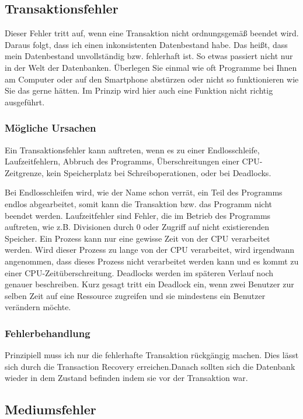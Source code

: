 \begin{flushleft}
\subsection{Transaktionsfehler}
Dieser Fehler tritt auf, wenn eine Transaktion nicht ordnungsgemäß beendet wird. Daraus folgt, dass ich einen inkonsistenten Datenbestand habe. Das heißt, dass mein Datenbestand unvollständig bzw. fehlerhaft ist. So etwas passiert nicht nur in der Welt der Datenbanken. Überlegen Sie einmal wie oft Programme bei Ihnen am Computer oder auf den Smartphone abstürzen oder nicht so funktionieren wie Sie das gerne hätten. Im Prinzip wird hier auch eine Funktion nicht richtig ausgeführt.

\subsubsection{Mögliche Ursachen}

Ein Transaktionsfehler kann auftreten, wenn es zu einer Endlosschleife, Laufzeitfehlern, Abbruch des Programms, Überschreitungen einer CPU-Zeitgrenze, kein Speicherplatz bei Schreiboperationen, oder bei Deadlocks.

Bei Endlosschleifen wird, wie der Name schon verrät, ein Teil des Programms endlos abgearbeitet, somit kann die Transaktion bzw. das Programm nicht beendet werden. 
Laufzeitfehler sind Fehler, die im Betrieb des Programms auftreten, wie z.B. Divisionen durch 0 oder Zugriff auf nicht existierenden Speicher. 
Ein Prozess kann nur eine gewisse Zeit von der CPU verarbeitet werden. Wird dieser Prozess zu lange von der CPU verarbeitet, wird irgendwann angenommen, dass dieses Prozess nicht verarbeitet werden kann und es kommt zu einer CPU-Zeitüberschreitung.
Deadlocks werden im späteren Verlauf noch genauer beschreiben. Kurz gesagt tritt ein Deadlock ein, wenn zwei Benutzer zur selben Zeit auf eine Ressource zugreifen und sie mindestens ein Benutzer verändern möchte.

\subsubsection{Fehlerbehandlung}

Prinzipiell muss ich nur die fehlerhafte Transaktion rückgängig machen. Dies lässt sich durch die Transaction Recovery erreichen.Danach sollten sich die Datenbank wieder in dem Zustand befinden indem sie vor der Transaktion war.

\subsection{Mediumsfehler}


\end{flushleft}
